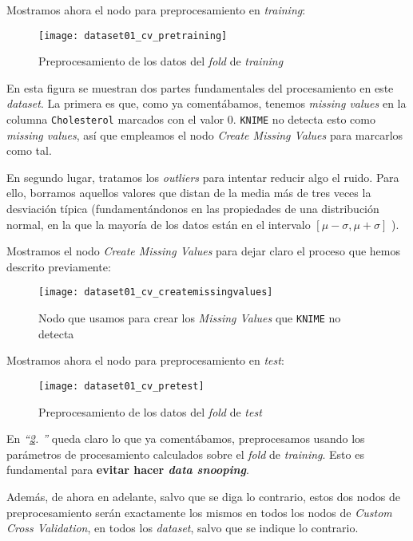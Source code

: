 \documentclass[11pt]{article}
\newcommand{\customcite}[1]{\emph{``\ref{#1}. \nameref{#1}''}}
\begin{document}
Mostramos ahora el nodo para preprocesamiento en \emph{training}:

\begin{figure}[H]
    \centering
    \texttt{[image: dataset01\_cv\_pretraining]}
    \caption{Preprocesamiento de los datos del \emph{fold} de \emph{training}}
\end{figure}

En esta figura se muestran dos partes fundamentales del procesamiento en este \emph{dataset}. La primera es que, como ya comentábamos, tenemos \emph{missing values} en la columna \lstinline{Cholesterol} marcados con el valor 0. \lstinline{KNIME} no detecta esto como \emph{missing values}, así que empleamos el nodo \emph{Create Missing Values} para marcarlos como tal.

En segundo lugar, tratamos los \emph{outliers} para intentar reducir algo el ruido. Para ello, borramos aquellos valores que distan de la media más de tres veces la desviación típica (fundamentándonos en las propiedades de una distribución normal, en la que la mayoría de los datos están en el intervalo $[\mu - \sigma, \mu + \sigma]$ \cite{intervalos_normal:online}).

Mostramos el nodo \emph{Create Missing Values} para dejar claro el proceso que hemos descrito previamente:

\begin{figure}[H]
    \centering
    \texttt{[image: dataset01\_cv\_createmissingvalues]}
    \caption{Nodo que usamos para crear los \emph{Missing Values} que \lstinline{KNIME} no detecta}
    \label{pretest:imagen}
\end{figure}

Mostramos ahora el nodo para preprocesamiento en \emph{test}:

\begin{figure}[H]
    \centering
    \texttt{[image: dataset01\_cv\_pretest]}
    \caption{Preprocesamiento de los datos del \emph{fold} de \emph{test}}
    \label{pretest:imagen}
\end{figure}

En \customcite{pretest:imagen} queda claro lo que ya comentábamos, preprocesamos usando los parámetros de procesamiento calculados sobre el \emph{fold} de \emph{training}. Esto es fundamental para \textbf{evitar hacer \emph{data snooping}}.

Además, de ahora en adelante, salvo que se diga lo contrario, estos dos nodos de preprocesamiento serán exactamente los mismos en todos los nodos de \emph{Custom Cross Validation}, en todos los \emph{dataset}, salvo que se indique lo contrario.
\end{document}
